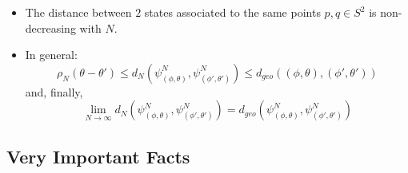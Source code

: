 \documentclass{article}
\begin{document}
\begin{itemize}
    \item The distance between $2$ states associated to the same points $p, q \in S^2$ is non-decreasing with $N$.
    
    \item In general:
    \begin{equation}
        \rho_N(\theta - \theta') \leq d_N(\psi^N_{(\phi, \theta)}, \psi^N_{(\phi', \theta')}) \leq d_{geo}((\phi, \theta), (\phi', \theta'))
    \end{equation} and, finally,
    \begin{equation}
        \lim_{N \to \infty} d_N(\psi^N_{(\phi, \theta)}, \psi^N_{(\phi', \theta')}) = d_{geo}(\psi^N_{(\phi, \theta)}, \psi^N_{(\phi', \theta')})
    \end{equation}
    
    \end{itemize}

\subsection{Very Important Facts} %
\end{document}
